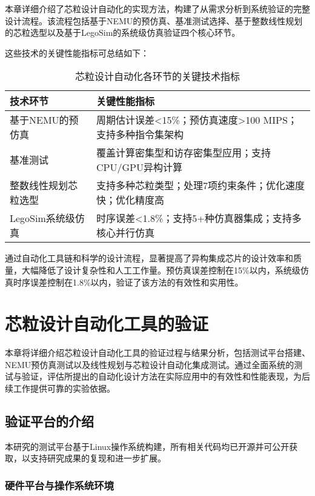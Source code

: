 \documentclass[bachelor]{thesis-uestc}
\begin{document}
本章详细介绍了芯粒设计自动化的实现方法，构建了从需求分析到系统验证的完整设计流程。该流程包括基于NEMU的预仿真、基准测试选择、基于整数线性规划的芯粒选型以及基于LegoSim的系统级仿真验证四个核心环节。

这些技术的关键性能指标可总结如下：

\begin{table}[htbp]
\caption{芯粒设计自动化各环节的关键技术指标}
\centering
\begin{tabular}{|l|p{10cm}|}
\hline
\textbf{技术环节} & \textbf{关键性能指标} \\
\hline
基于NEMU的预仿真 & 周期估计误差<15\%；预仿真速度>100 MIPS；支持多种指令集架构 \\
\hline
基准测试 & 覆盖计算密集型和访存密集型应用；支持CPU/GPU异构计算 \\
\hline
整数线性规划芯粒选型 & 支持多种芯粒类型；处理7项约束条件；优化速度快；优化精度高\\
\hline
LegoSim系统级仿真 & 时序误差<1.8\%；支持5+种仿真器集成；支持多核心并行仿真 \\
\hline
\end{tabular}
\label{tab:key_metrics}
\end{table}

通过自动化工具链和科学的设计流程，显著提高了异构集成芯片的设计效率和质量，大幅降低了设计复杂性和人工工作量。预仿真误差控制在15\%以内，系统级仿真时序误差控制在1.8\%以内，验证了该方法的有效性和实用性。



\chapter{芯粒设计自动化工具的验证}

本章将详细介绍芯粒设计自动化工具的验证过程与结果分析，包括测试平台搭建、NEMU预仿真测试以及线性规划与芯粒设计自动化集成测试。通过全面系统的测试与验证，评估所提出的自动化设计方法在实际应用中的有效性和性能表现，为后续工作提供可靠的实验依据。

\section{验证平台的介绍}

本研究的测试平台基于Linux操作系统构建，所有相关代码均已开源并可公开获取，以支持研究成果的复现和进一步扩展。

\subsection{硬件平台与操作系统环境}
\end{document}
